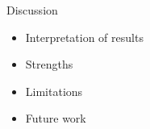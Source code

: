 
\begin{frame}{Discussion}
	
	\begin{itemize}
		\item Interpretation of results
		\item Strengths
		\item Limitations
		\item Future work
	\end{itemize}
	
\end{frame}